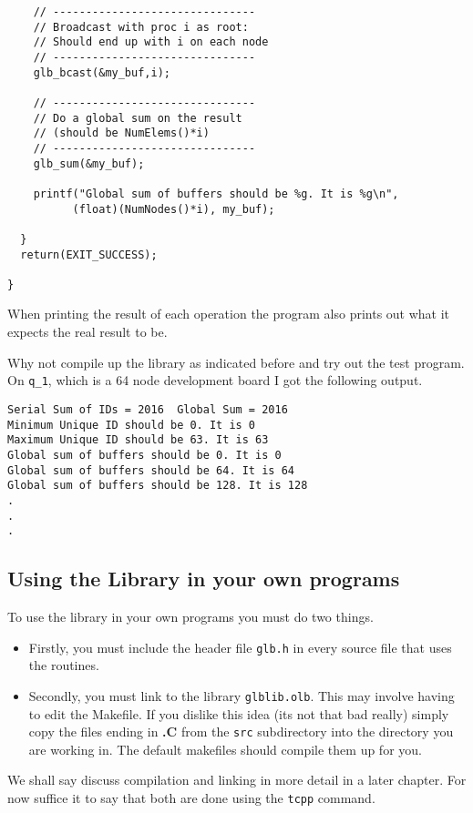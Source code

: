 {\begin{verbatim}
    // -------------------------------
    // Broadcast with proc i as root: 
    // Should end up with i on each node
    // -------------------------------
    glb_bcast(&my_buf,i);
    
    // -------------------------------
    // Do a global sum on the result 
    // (should be NumElems()*i)
    // -------------------------------
    glb_sum(&my_buf);

    printf("Global sum of buffers should be %g. It is %g\n", 
          (float)(NumNodes()*i), my_buf);

  }
  return(EXIT_SUCCESS);

}
\end{verbatim}
}
When printing the result of each operation the program also prints
out what it expects the real result to be.

Why not compile up the library as indicated before and try out the test
program. On {\tt q\_1}, which is a 64 node development board I got
the following output.
\begin{verbatim}
Serial Sum of IDs = 2016  Global Sum = 2016
Minimum Unique ID should be 0. It is 0
Maximum Unique ID should be 63. It is 63
Global sum of buffers should be 0. It is 0
Global sum of buffers should be 64. It is 64
Global sum of buffers should be 128. It is 128
.
.
.
\end{verbatim}

\subsection{Using the Library in your own programs}
To use the library in your own programs you must do two things.
\begin{itemize}
\item
Firstly, you must include the header file {\tt glb.h} in every
source file that uses the routines.
\item
Secondly, you must link to the library {\tt glblib.olb}. This
may involve having to edit the Makefile. If you dislike this
idea (its not that bad really) simply copy the files ending in
{\bf .C} from the {\tt src} subdirectory into the directory 
you are working in. The default makefiles should compile
them up for you.
\end{itemize}

We shall say discuss compilation and linking in more detail in 
a later chapter. For now suffice it to say that both are done
using the {\tt tcpp} command. 

